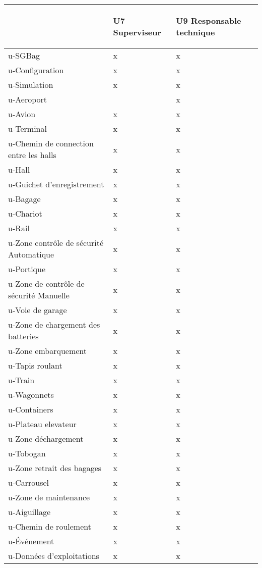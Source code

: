 \begin {tabular} {| l | l | l |}
\hline
~
&\begin{sideways}U7 Superviseur\end{sideways}
&\begin{sideways}U9 Responsable technique~\end{sideways}\\
\hline
u-SGBag &x &x \\
\hline
u-Configuration &x &x \\
\hline
u-Simulation &x &x \\
\hline
u-Aeroport & &x \\
\hline
u-Avion  &x &x \\
\hline
u-Terminal  &x &x \\
\hline
u-Chemin de connection entre les halls &x &x \\
\hline
u-Hall  &x &x \\
\hline
u-Guichet d'enregistrement &x &x \\
\hline
u-Bagage  &x &x \\
\hline
u-Chariot  &x &x \\
\hline
u-Rail &x &x \\
\hline
u-Zone contrôle de sécurité Automatique &x &x \\
\hline
u-Portique &x &x \\
\hline
u-Zone de contrôle de sécurité Manuelle &x &x \\
\hline
u-Voie de garage &x &x \\
\hline
u-Zone de chargement des batteries  &x &x \\
\hline
u-Zone embarquement  &x &x \\
\hline
u-Tapis roulant  &x &x \\
\hline
u-Train  &x &x \\
\hline
u-Wagonnets  &x &x \\
\hline
u-Containers  &x &x \\
\hline
u-Plateau elevateur  &x &x \\
\hline
u-Zone déchargement  &x &x \\
\hline
u-Tobogan  &x &x \\
\hline
u-Zone retrait des bagages  &x &x \\
\hline
u-Carrousel  &x &x \\
\hline
u-Zone de maintenance &x &x \\
\hline
u-Aiguillage &x &x \\
\hline
u-Chemin de roulement &x &x \\
\hline
u-\'{E}vénement &x &x \\
\hline
u-Données d'exploitations &x &x \\
\hline
\end {tabular}
